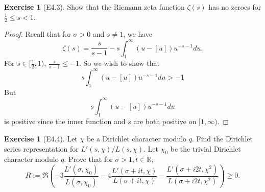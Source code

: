 \documentclass[reqno]{amsart}
\theoremstyle{definition}
\newtheorem{exercise}[theorem]{Exercise}
\theoremstyle{remark}
\begin{document}
\begin{exercise}[E4.3]
    Show that the Riemann zeta function $\zeta (s)$ has no
    zeroes for $\frac{1}{2} \le s < 1$.
\end{exercise}

\begin{proof}
    Recall that for $\sigma > 0$ and $s\neq 1$, we have
    \[
    \zeta (s) = \frac{s}{s-1} - s \int_{1}^{\infty} 
    \left( u - \left[ u \right]  \right) u^{-s-1}du.
    \] 
    For $s \in [\frac{1}{2},1)$, 
    $\frac{s}{s-1} \le  -1$. So we
    wish to show that
    \[
    s \int_{1}^{\infty} \left( u - \left[ u \right]  \right) 
    u^{-s-1} du > -1
    \] 
    But
    \[
        s \int_{1}^{\infty} 
        \left( u - \left[ u \right]  \right) u^{-s-1}du
    \] 
    is positive since the inner function and $s$ are
    both positive on $[1, \infty)$.

\end{proof}

\begin{exercise}[E4.4]
    Let $\chi$ be a Dirichlet character modulo $q$. Find the
    Dirichlet series representation for
    $L'(s, \chi) / L(s,\chi)$. Let $\chi_0$ be the trivial
    Dirichlet character modulo $q$. Prove that for
    $\sigma > 1, t \in \mathbb{R}$,
    \[
    R := \Re \left( -3 \frac{L'(\sigma, \chi_0)}{L(\sigma, \chi_0)}-
    4 \frac{L' (\sigma + it , \chi)}{L(\sigma + it, \chi)}-
\frac{L' (\sigma + i 2t, \chi^2) }{L(\sigma + i 2 t, \chi^2)}\right) 
\ge 0.
    \] 
\end{exercise}
\end{document}
